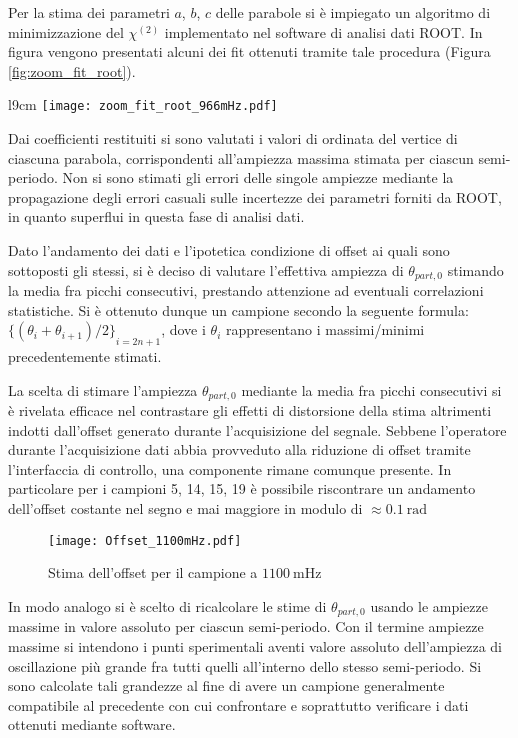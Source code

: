 \documentclass[a4paper,11pt,oneside]{article}
\begin{document}
Per la stima dei parametri $a$, $b$, $c$ delle parabole si è impiegato un algoritmo di minimizzazione del $\chi^{(2)}$ implementato nel software di analisi dati ROOT. In figura vengono presentati alcuni dei fit ottenuti tramite tale procedura (Figura \ref{fig:zoom_fit_root}).

\begin{wrapfigure}{l}{9cm}
    \texttt{[image: zoom\_fit\_root\_966mHz.pdf]}
    \caption{Esempio interpolazione parabolica}
    \label{fig:zoom_fit_root}
\end{wrapfigure}

Dai coefficienti restituiti si sono valutati i valori di ordinata del vertice di ciascuna parabola, corrispondenti all'ampiezza massima stimata per ciascun semi-periodo. Non si sono stimati gli errori delle singole ampiezze mediante la propagazione degli errori casuali sulle incertezze dei parametri forniti da ROOT, in quanto superflui in questa fase di analisi dati.

Dato l'andamento dei dati e l'ipotetica condizione di offset ai quali sono sottoposti gli stessi, si è deciso di valutare l'effettiva ampiezza di $\theta_{part,0}$ stimando la media fra picchi consecutivi, prestando attenzione ad eventuali correlazioni statistiche. Si è ottenuto dunque un campione secondo la seguente formula: ${\{(\theta_{i}+\theta_{i+1})/2\}}_{i=2n+1}$, dove i  $\theta_{i}$ rappresentano i massimi/minimi precedentemente stimati.

La scelta di stimare l'ampiezza $\theta_{part, 0}$ mediante la media fra picchi consecutivi si è rivelata efficace nel contrastare gli effetti di distorsione della stima altrimenti indotti dall'offset generato durante l'acquisizione del segnale. Sebbene l'operatore durante l'acquisizione dati abbia provveduto alla riduzione di offset tramite l'interfaccia di controllo, una componente rimane comunque presente. In particolare per i campioni 5, 14, 15, 19 è possibile riscontrare un andamento dell'offset costante nel segno e mai maggiore in modulo di $\approx \SI{0,1}{\radian}$\newline

\begin{figure}[h!]
    \centering
    \texttt{[image: Offset\_1100mHz.pdf]}
    \caption{Stima dell'offset per il campione a $\SI{1100}{\milli\hertz}$}
    \label{fig:offset}
\end{figure}
In modo analogo si è scelto di ricalcolare le stime di $\theta_{part, 0}$ usando le ampiezze massime in valore assoluto per ciascun semi-periodo. Con il termine ampiezze massime si intendono i punti sperimentali aventi valore assoluto dell'ampiezza di oscillazione più grande fra tutti quelli all'interno dello stesso semi-periodo. Si sono calcolate tali grandezze al fine di avere un campione generalmente compatibile al precedente con cui confrontare e soprattutto verificare i dati ottenuti mediante software.\\
\end{document}
